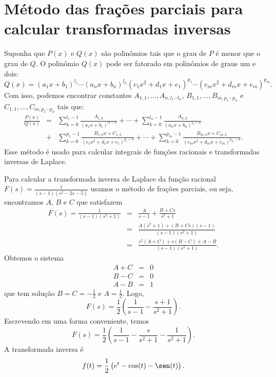 \section{Método das frações parciais para calcular transformadas inversas}
Suponha que $P(x)$ e $Q(x)$ são polinômios tais que o grau de $P$ é menor que o grau de $Q$. O polinômio $Q(x)$ pode ser fatorado em polinômios de graus um e dois:
 \begin{equation}
Q(x) = (a_1x + b_1)^{l_1}\cdots (a_nx + b_n)^{l_n}(c_1x^2 + d_1x + e_1)^{p_1}\cdots (c_m x^2 + d_m x + e_m)^{p_m}.
\end{equation}
Com isso, podemos encontrar constantes $A_{1,1}, \ldots, A_{n,l_1\cdots l_n}$, $B_{1,1}, \ldots, B_{m,p_1\cdots p_n}$ e $C_{1,1}, \ldots, C_{m,p_1\cdots p_n}$ tais que:
\begin{eqnarray*}
\frac{P(x)}{Q(x)} &=& \sum_{k=0}^{l_1-1} \frac{A_{1,k}}{(a_1x + b_1)^{l1-k}} + \cdots + \sum_{k=0}^{l_n-1}\frac{A_{n,k}}{(a_nx + b_n)^{l_n-k}} \\&+& \sum_{k=0}^{p_1-1} \frac{B_{1,k}x + C_{1,k}}{(c_1 x^2 + d_1 x + e_1)^{p_1-k}} + \cdots + \sum_{k=0}^{p_m-1} \frac{B_{m,k}x + C_{m,k}}{(c_mx^2 + d_mx + e_m)^{p_m-k}}.
\end{eqnarray*}
Esse método é usado para calcular integrais de funções racionais e transformadas inversas de Laplace.
\begin{ex}Para calcular a transformada inversa de Laplace da função racional $F(s)=\frac{1}{(s-1)(s^2-2s-5)}$ usamos o método de frações parciais, ou seja, encontramos $A$, $B$ e $C$ que satisfazem
\begin{eqnarray*}
 F(s)=\frac{1}{(s-1)(s^2+1)}&=&\frac{A}{s-1}+\frac{B+Cs}{s^2+1}\\&=&\frac{A(s^2+1)+(B+Cs)(s-1)}{(s-1)(s^2+1)}\\
 &=&\frac{s^2(A+C)+s(B-C)+A-B}{(s-1)(s^2+1)}.
\end{eqnarray*}
Obtemos o sistema
\begin{eqnarray*}
A+C&=&0\\
B-C&=&0\\
A-B&=&1
\end{eqnarray*}
que tem solução $B=C=-\frac{1}{2}$ e $A=\frac{1}{2}$. Logo,
 \begin{equation}
F(s)=\frac{1}{2}\left(\frac{1}{s-1}-\frac{s+1}{s^2+1}\right).
\end{equation}
Escrevendo em uma forma conveniente, temos
 \begin{equation}
F(s)=\frac{1}{2}\left(\frac{1}{s-1}-\frac{s}{s^2+1}-\frac{1}{s^2+1}\right).
\end{equation}
A transformada inversa é
 \begin{equation}
f(t)=\frac{1}{2}\left(e^{t}-\cos(t)-\sen(t)\right).
\end{equation}
\end{ex}

